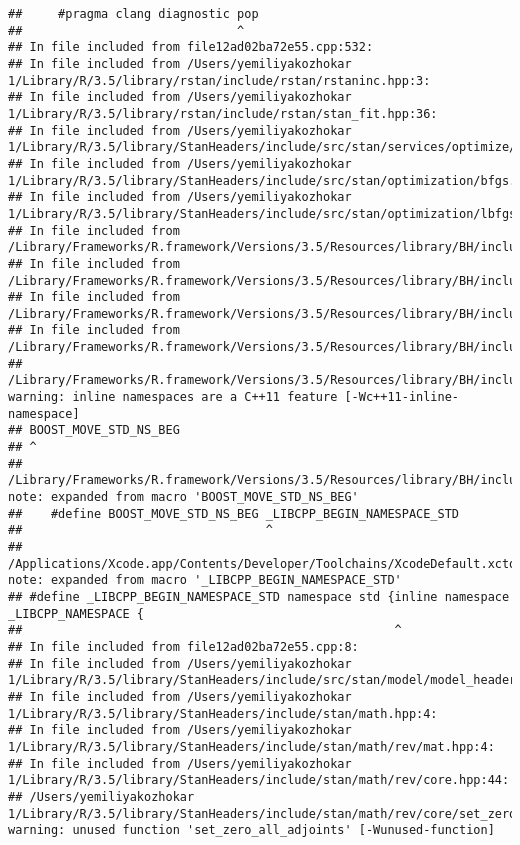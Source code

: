 \documentclass[]{article}
\begin{document}
\begin{verbatim}
##     #pragma clang diagnostic pop
##                              ^
## In file included from file12ad02ba72e55.cpp:532:
## In file included from /Users/yemiliyakozhokar 1/Library/R/3.5/library/rstan/include/rstan/rstaninc.hpp:3:
## In file included from /Users/yemiliyakozhokar 1/Library/R/3.5/library/rstan/include/rstan/stan_fit.hpp:36:
## In file included from /Users/yemiliyakozhokar 1/Library/R/3.5/library/StanHeaders/include/src/stan/services/optimize/bfgs.hpp:11:
## In file included from /Users/yemiliyakozhokar 1/Library/R/3.5/library/StanHeaders/include/src/stan/optimization/bfgs.hpp:9:
## In file included from /Users/yemiliyakozhokar 1/Library/R/3.5/library/StanHeaders/include/src/stan/optimization/lbfgs_update.hpp:6:
## In file included from /Library/Frameworks/R.framework/Versions/3.5/Resources/library/BH/include/boost/circular_buffer.hpp:54:
## In file included from /Library/Frameworks/R.framework/Versions/3.5/Resources/library/BH/include/boost/circular_buffer/details.hpp:20:
## In file included from /Library/Frameworks/R.framework/Versions/3.5/Resources/library/BH/include/boost/move/move.hpp:30:
## In file included from /Library/Frameworks/R.framework/Versions/3.5/Resources/library/BH/include/boost/move/iterator.hpp:27:
## /Library/Frameworks/R.framework/Versions/3.5/Resources/library/BH/include/boost/move/detail/iterator_traits.hpp:29:1: warning: inline namespaces are a C++11 feature [-Wc++11-inline-namespace]
## BOOST_MOVE_STD_NS_BEG
## ^
## /Library/Frameworks/R.framework/Versions/3.5/Resources/library/BH/include/boost/move/detail/std_ns_begin.hpp:18:34: note: expanded from macro 'BOOST_MOVE_STD_NS_BEG'
##    #define BOOST_MOVE_STD_NS_BEG _LIBCPP_BEGIN_NAMESPACE_STD
##                                  ^
## /Applications/Xcode.app/Contents/Developer/Toolchains/XcodeDefault.xctoolchain/usr/include/c++/v1/__config:390:52: note: expanded from macro '_LIBCPP_BEGIN_NAMESPACE_STD'
## #define _LIBCPP_BEGIN_NAMESPACE_STD namespace std {inline namespace _LIBCPP_NAMESPACE {
##                                                    ^
## In file included from file12ad02ba72e55.cpp:8:
## In file included from /Users/yemiliyakozhokar 1/Library/R/3.5/library/StanHeaders/include/src/stan/model/model_header.hpp:4:
## In file included from /Users/yemiliyakozhokar 1/Library/R/3.5/library/StanHeaders/include/stan/math.hpp:4:
## In file included from /Users/yemiliyakozhokar 1/Library/R/3.5/library/StanHeaders/include/stan/math/rev/mat.hpp:4:
## In file included from /Users/yemiliyakozhokar 1/Library/R/3.5/library/StanHeaders/include/stan/math/rev/core.hpp:44:
## /Users/yemiliyakozhokar 1/Library/R/3.5/library/StanHeaders/include/stan/math/rev/core/set_zero_all_adjoints.hpp:14:17: warning: unused function 'set_zero_all_adjoints' [-Wunused-function]

\end{verbatim}
\end{document}
